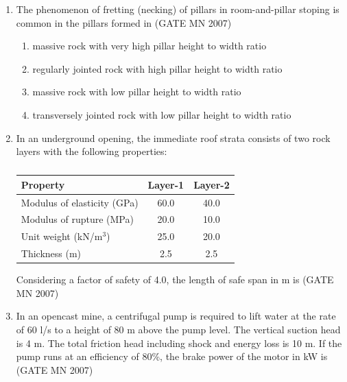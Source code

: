 \documentclass[journal]{IEEEtran}
\begin{document}
\begin{enumerate}
\item The phenomenon of fretting (necking) of pillars in room-and-pillar stoping is common in the pillars formed in
	\hfill (GATE MN 2007)
\begin{enumerate}
\item massive rock with very high pillar height to width ratio
\item regularly jointed rock with high pillar height to width ratio
\item massive rock with low pillar height to width ratio
\item transversely jointed rock with low pillar height to width ratio
\end{enumerate}
\item In an underground opening, the immediate roof strata consists of two rock layers with the following properties:

\begin{table}[H]
    \centering\normalsize
\begin{tabular}{|l|c|c|}
\hline
Property & Layer-1 & Layer-2 \\
\hline
Modulus of elasticity (GPa) & 60.0 & 40.0 \\
\hline
Modulus of rupture (MPa) & 20.0 & 10.0 \\
\hline
Unit weight (kN/m$^3$) & 25.0 & 20.0 \\
\hline
Thickness (m) & 2.5 & 2.5 \\
\hline
\end{tabular}
\caption{}
    \label{tab:Q37}
\end{table}

Considering a factor of safety of 4.0, the length of safe span in m is
\hfill (GATE MN 2007)
\begin{enumerate}
\end{enumerate}


\item In an opencast mine, a centrifugal pump is required to lift water at the rate of 60 l/s to a height of 80 m above the pump level. The vertical suction head is 4 m. The total friction head including shock and energy loss is 10 m. If the pump runs at an efficiency of 80\%, the brake power of the motor in kW is
	\hfill (GATE MN 2007)
\begin{enumerate}
\end{enumerate}




\end{enumerate}
\end{document}
